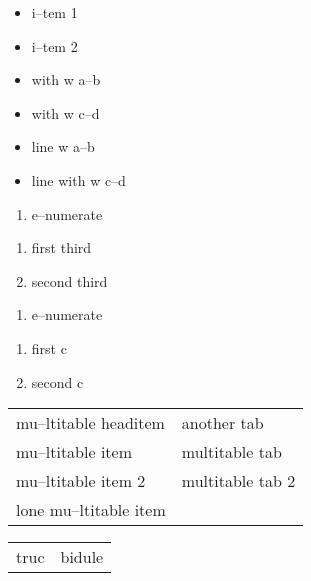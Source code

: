 \documentclass{book}
\begin{document}
\begin{itemize}[label=\textbullet{} a--n itemize line]
\item {}%
i--tem 1
\item i--tem 2
\end{itemize}

\begin{itemize}[label={}]
\item with w a--b
\item with w c--d
\end{itemize}

\begin{itemize}[label=\hbox{} on a line]
\item line w a--b
\item line with w c--d
\end{itemize}

\begin{enumerate}[start=1]
\item e--numerate
\end{enumerate}

\begin{enumerate}[start=3]
\item first third
\item second third
\end{enumerate}

\begin{enumerate}[label=\alph*.]
\item e--numerate
\end{enumerate}

\begin{enumerate}[label=\alph*.,start=3]
\item first c
\item second c
\end{enumerate}

\begin{tabular}{m{} m{}}%
mu--ltitable headitem &another tab\\
mu--ltitable item &multitable tab\\
mu--ltitable item 2 &multitable tab 2
\index[cp]{index entry within multitable}%
\\
lone mu--ltitable item&\\
\end{tabular}%

\begin{tabular}{m{} m{}}%
truc &bidule\\
\end{tabular}%
\end{document}
